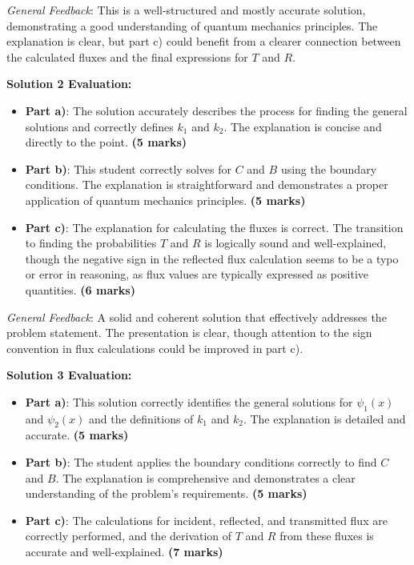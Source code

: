\documentclass[a4paper,11pt]{article}
\begin{document}
\textit{General Feedback}: This is a well-structured and mostly accurate solution, demonstrating a good understanding of quantum mechanics principles. The explanation is clear, but part c) could benefit from a clearer connection between the calculated fluxes and the final expressions for \(T\) and \(R\).

\textbf{Solution 2 Evaluation:}

\begin{itemize}
    \item \textbf{Part a)}: The solution accurately describes the process for finding the general solutions and correctly defines \(k_1\) and \(k_2\). The explanation is concise and directly to the point. \textbf{(5 marks)}
    \item \textbf{Part b)}: This student correctly solves for \(C\) and \(B\) using the boundary conditions. The explanation is straightforward and demonstrates a proper application of quantum mechanics principles. \textbf{(5 marks)}
    \item \textbf{Part c)}: The explanation for calculating the fluxes is correct. The transition to finding the probabilities \(T\) and \(R\) is logically sound and well-explained, though the negative sign in the reflected flux calculation seems to be a typo or error in reasoning, as flux values are typically expressed as positive quantities. \textbf{(6 marks)}
\end{itemize}

\textit{General Feedback}: A solid and coherent solution that effectively addresses the problem statement. The presentation is clear, though attention to the sign convention in flux calculations could be improved in part c).

\textbf{Solution 3 Evaluation:}

\begin{itemize}
    \item \textbf{Part a)}: This solution correctly identifies the general solutions for \(\psi_1(x)\) and \(\psi_2(x)\) and the definitions of \(k_1\) and \(k_2\). The explanation is detailed and accurate. \textbf{(5 marks)}
    \item \textbf{Part b)}: The student applies the boundary conditions correctly to find \(C\) and \(B\). The explanation is comprehensive and demonstrates a clear understanding of the problem's requirements. \textbf{(5 marks)}
    \item \textbf{Part c)}: The calculations for incident, reflected, and transmitted flux are correctly performed, and the derivation of \(T\) and \(R\) from these fluxes is accurate and well-explained. \textbf{(7 marks)}
\end{itemize}
\end{document}
